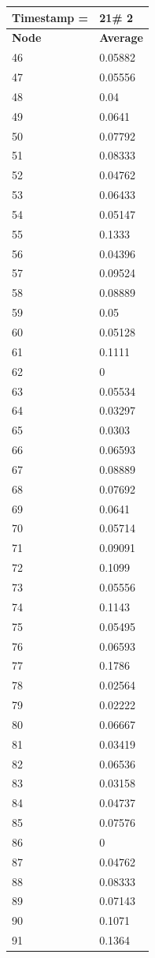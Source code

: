 \begin{tabular}{|l||l|}
\hline
\textbf{Timestamp =} & \textbf{21}\# 2\\\hline
	\textbf{Node} & \textbf{Average} \\ \hline
\hline
	46 & 0.05882 \\ \hline
	47 & 0.05556 \\ \hline
	48 & 0.04 \\ \hline
	49 & 0.0641 \\ \hline
	50 & 0.07792 \\ \hline
	51 & 0.08333 \\ \hline
	52 & 0.04762 \\ \hline
	53 & 0.06433 \\ \hline
	54 & 0.05147 \\ \hline
	55 & 0.1333 \\ \hline
	56 & 0.04396 \\ \hline
	57 & 0.09524 \\ \hline
	58 & 0.08889 \\ \hline
	59 & 0.05 \\ \hline
	60 & 0.05128 \\ \hline
	61 & 0.1111 \\ \hline
	62 & 0 \\ \hline
	63 & 0.05534 \\ \hline
	64 & 0.03297 \\ \hline
	65 & 0.0303 \\ \hline
	66 & 0.06593 \\ \hline
	67 & 0.08889 \\ \hline
	68 & 0.07692 \\ \hline
	69 & 0.0641 \\ \hline
	70 & 0.05714 \\ \hline
	71 & 0.09091 \\ \hline
	72 & 0.1099 \\ \hline
	73 & 0.05556 \\ \hline
	74 & 0.1143 \\ \hline
	75 & 0.05495 \\ \hline
	76 & 0.06593 \\ \hline
	77 & 0.1786 \\ \hline
	78 & 0.02564 \\ \hline
	79 & 0.02222 \\ \hline
	80 & 0.06667 \\ \hline
	81 & 0.03419 \\ \hline
	82 & 0.06536 \\ \hline
	83 & 0.03158 \\ \hline
	84 & 0.04737 \\ \hline
	85 & 0.07576 \\ \hline
	86 & 0 \\ \hline
	87 & 0.04762 \\ \hline
	88 & 0.08333 \\ \hline
	89 & 0.07143 \\ \hline
	90 & 0.1071 \\ \hline
	91 & 0.1364 \\ \hline
\end{tabular}
